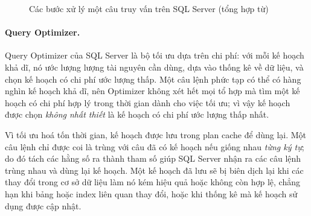 \begin{figure}[H]
    \centering
    \caption{Các bước xử lý một câu truy vấn trên SQL Server (tổng hợp từ)}
    \label{fig:mssql-flow}
\end{figure}

\paragraph{Query Optimizer.}
Query Optimizer của SQL Server là bộ tối ưu dựa trên chi phí: với mỗi kế hoạch khả dĩ, nó ước lượng lượng tài nguyên cần dùng, dựa vào thống kê về dữ liệu, và chọn kế hoạch có chi phí ước lượng thấp. Một câu lệnh phức tạp có thể có hàng nghìn kế hoạch khả dĩ, nên Optimizer không xét hết mọi tổ hợp mà tìm một kế hoạch có chi phí hợp lý trong thời gian dành cho việc tối ưu; vì vậy kế hoạch được chọn \textit{không nhất thiết} là kế hoạch có chi phí ước lượng thấp nhất.

Vì tối ưu hoá tốn thời gian, kế hoạch được lưu trong plan cache để dùng lại. Một câu lệnh chỉ được coi là trùng với câu đã có kế hoạch nếu giống nhau \textit{từng ký tự}; do đó tách các hằng số ra thành tham số giúp SQL Server nhận ra các câu lệnh trùng nhau và dùng lại kế hoạch. Một kế hoạch đã lưu sẽ bị biên dịch lại khi các thay đổi trong cơ sở dữ liệu làm nó kém hiệu quả hoặc không còn hợp lệ, chẳng hạn khi bảng hoặc index liên quan thay đổi, hoặc khi thống kê mà kế hoạch sử dụng được cập nhật.

